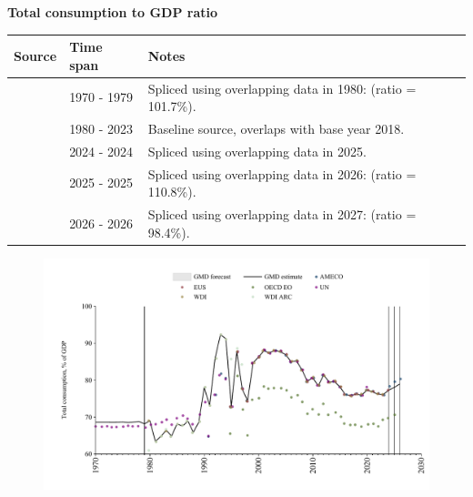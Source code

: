 \documentclass[12pt,a4paper,landscape]{article}
\begin{document}
\begin{adjustbox}{max totalsize={\paperwidth}{\paperheight},center}
\begin{minipage}[t][\textheight][t]{\textwidth}
\vspace*{0.5cm}
{}
\begin{center}
{\Large\bfseries Total consumption to GDP ratio}
\end{center}
\vspace{0.5cm}
\begin{table}[H]
\centering
\small
\begin{tabular}{|l|l|l|}
\hline
\textbf{Source} & \textbf{Time span} & \textbf{Notes} \\
\hline
\rowcolor{white}\cite{UN}& 1970 - 1979 &Spliced using overlapping data in 1980: (ratio = 101.7\%). \\
\rowcolor{lightgray}\cite{WDI}& 1980 - 2023 &Baseline source, overlaps with base year 2018. \\
\rowcolor{white}\cite{EUS}& 2024 - 2024 &Spliced using overlapping data in 2025. \\
\rowcolor{lightgray}\cite{OECD_EO}& 2025 - 2025 &Spliced using overlapping data in 2026: (ratio = 110.8\%). \\
\rowcolor{white}\cite{AMECO}& 2026 - 2026 &Spliced using overlapping data in 2027: (ratio = 98.4\%). \\
\hline
\end{tabular}
\end{table}
\begin{figure}[H]
\centering
\includegraphics[width=\textwidth,height=0.6\textheight,keepaspectratio]{graphs/BGR_cons_GDP.pdf}
\end{figure}
\end{minipage}
\end{adjustbox}
\end{document}
